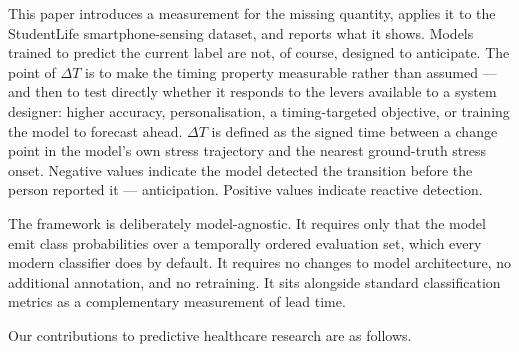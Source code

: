 \documentclass[preprint,12pt,authoryear]{elsarticle}
\newcommand{\dt}{$\Delta T$}
\begin{document}
This paper introduces a measurement for the missing quantity, applies
it to the StudentLife smartphone-sensing dataset, and reports
what it shows. Models trained to predict the current label are not, of
course, designed to anticipate. The point of \dt{} is to make the
timing property measurable rather than assumed --- and then to test
directly whether it responds to the levers available to a system
designer: higher accuracy, personalisation, a timing-targeted
objective, or training the model to forecast ahead. \dt{} is defined as the signed time between a change
point in the model's own stress trajectory and the nearest
ground-truth stress onset. Negative values indicate the model detected
the transition before the person reported it --- anticipation. Positive
values indicate reactive detection.

The framework is deliberately model-agnostic. It requires only that the
model emit class probabilities over a temporally ordered evaluation set,
which every modern classifier does by default. It requires no changes
to model architecture, no additional annotation, and no retraining. It
sits alongside standard classification metrics as a complementary
measurement of lead time.

Our contributions to predictive healthcare research are as follows.
\end{document}
